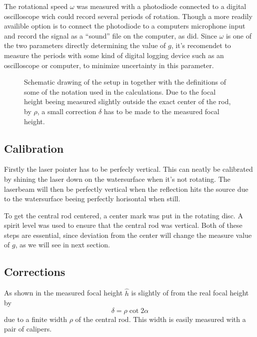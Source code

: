 \documentclass[11pt,towcolumn, swedish, english]{article}
\begin{document}
The rotational speed $\omega$ was measured with a photodiode connected
to a digital oscilloscope wich could record several periods of
rotation. Though a more readily availible option is to connect the
photodiode to a computers microphone input and record the signal as a
``sound'' file on the computer, as \cite{Sabatka2010} did. Since
$\omega$ is one of the two parameters directly determining the value
of $g$, it's recomendet to measure the periods with some kind of
digital logging device such as an oscilloscope or computer, to
minimize uncertainty in this parameter.


\begin{figure}\centering
\resizebox{.6\linewidth}{!}{}
\caption{\label{fig:rot_bowl} Schematic drawing of the setup in
   together with the definitions of some of
  the notation used in the calculations. Due to the focal height
  beeing measured slightly outside the exact center of the rod, by
  $\rho$, a small correction $\delta$ has to be made to the measured
  focal height. }
\end{figure}

\subsection{Calibration}
Firstly the laser pointer has to be perfecly vertical. This can neatly be
calibrated by shining the laser down on the watersurface when it's not
rotating. The laserbeam will then be perfectly vertical when the
reflection hits the source due to the watersurface beeing perfectly
horisontal when still.

To get the central rod centered, a center mark was put in the rotating
disc. A spirit level was used to ensure that the central rod was
vertical. Both of these steps are essential, since deviation from the
center will change the measure value of $g$, as we will see in next
section. 

\subsection{Corrections}\label{sec:corrections}
As shown in  the measured focal height
$\hat{h}$ is slightly of from the real focal height by 
\begin{equation*}%
\delta=\rho\cot 2\alpha
\end{equation*}
due to a finite width $\rho$ of the central rod. This width is easily
measured with a pair of calipers.
\end{document}
